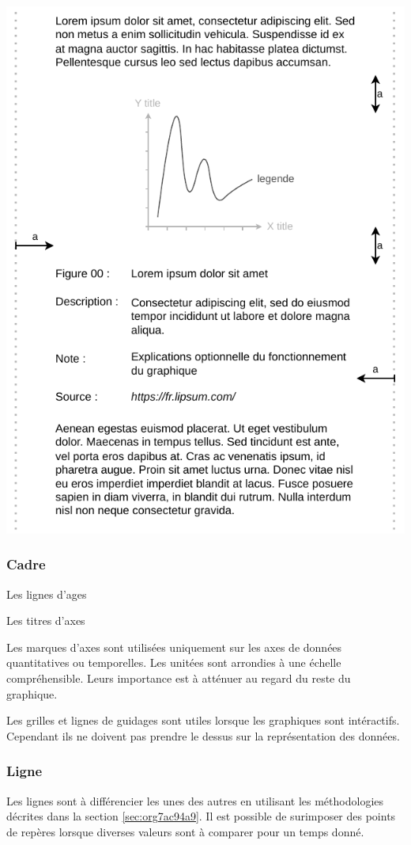 \documentclass[a4paper,12pt]{article}
\begin{document}
\begin{multicols}{2}
\begin{center}
\includegraphics[width=.9\linewidth]{./img/general-graphics-rules.pdf}
\end{center}
\subsubsection{Cadre}
\label{sec:orgd6adfba}
Les lignes d'ages

Les titres d'axes

Les marques d'axes sont utilisées uniquement sur les axes de données quantitatives ou temporelles. Les unitées sont arrondies à une échelle compréhensible. Leurs importance est à atténuer au regard du reste du graphique. \autocite{stephenfewComponentlevelGraphDesign2012}

Les grilles et lignes de guidages sont utiles lorsque les graphiques sont intéractifs. Cependant ils ne doivent pas prendre le dessus sur la représentation des données. \autocite{dougschepersDesigningDataCognitive2022}
\subsubsection{Ligne}
\label{sec:orga94c87c}
Les lignes sont à différencier les unes des autres en utilisant les méthodologies décrites dans la section \ref{sec:org7ac94a9}. Il est possible de surimposer des points de repères lorsque diverses valeurs sont à comparer pour un temps donné. \autocite{stephenfewComponentlevelGraphDesign2012}


\end{multicols}
\end{document}
